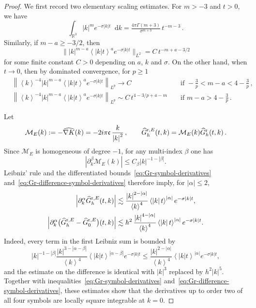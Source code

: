 \documentclass[a4paper,12pt]{amsart} %
\theoremstyle{plain}
\theoremstyle{definition}
\newcommand		{\RR}		{\mathbb R}			%
\newcommand		{\R}		{\RR}
\newcommand		{\Rd}		{\R^3}
\newcommand	{\cM}		{\mathcal M}		%
\newcommand		{\lt}			{\left}				%
\newcommand		{\rt}			{\right}			%
\renewcommand	{\(}			{\lt(}
\renewcommand	{\)}			{\rt)}
\newcommand		{\bangle}[1]	{\lt\langle #1\rt\rangle}
\newcommand		{\weight}[1]	{\bangle{#1}}	%
\newcommand		{\n}[1]			{\lt\lvert{#1}\rt\rvert}	%
\newcommand		{\nrm}[1]		{\lt\lVert{#1}\rt\rVert}		%
\newcommand		{\bnrm}[1]		{\big\lVert #1\big\rVert}
\newcommand		{\Nrm}[2]		{\nrm{#1}_{#2}}
\newcommand		{\bNrm}[2]		{\bnrm{#1}_{#2}}
\renewcommand		{\d}		{\mathop{}\!\mathrm{d}}		%
\newcommand		{\intd}			{\int_{\Rd}}
\newcommand	{\h}			{h}
\newcommand		{\CK}			{\mathfrak{c}}	%
\newcommand		{\hatG}			{\widehat{G}}
\newcommand		{\hatGr}		{\hatG^{\textnormal{r}}}
\newcommand		{\hatGrE}		{\hatG^{\textnormal{r},E}}
\begin{document}
	\begin{proof}
		We first record two elementary scaling estimates. For $m>-3$ and $t>0$, we have
		\begin{equation}\label{eq:radial-L1-scaling}
			\intd \n{k}^m e^{-\sigma \n{k}t} \d k = \tfrac{4\pi \Gamma(m+3)}{\sigma^{m+3}}\, t^{-m-3} \, .
		\end{equation}
		Similarly, if $m-a \geq - 3/2$, then
		\begin{equation}\label{eq:radial-L2-scaling}
			\bNrm{\n{k}^{m-a}\weight{\n{k}t}^{a}e^{-\sigma \n{k} t}}{L^2} = C\, t^{-m+a-3/2}
		\end{equation}
		for some finite constant $C>0$ depending on $a$, $k$ and $\sigma$. On the other hand, when $t\to 0$, then by dominated convergence, for $p\geq 1$
		\begin{align*} %
			&\Nrm{\weight{k}^{-4}\n{k}^{m-a}\weight{\n{k}t}^{a}e^{-\sigma \n{k} t}}{L^p} \to C &&\text{ if } -\frac{3}{p}<m-a<4-\frac{3}{p} \, ,
            \\
            &\Nrm{\weight{k}^{-4}\n{k}^{m-a}\weight{\n{k}t}^{a}e^{-\sigma \n{k} t}}{L^p} \sim C\,t^{4-3/p+a-m} &&\text{ if } m-a>4-\frac{3}{p} \, .
		\end{align*}

		Let
		\begin{equation*}
			\mathcal M_E(k) := -\widehat{\nabla K}(k) = -2i\pi \CK \, \frac{k}{\n{k}^2} \, ,
			\qquad
			\hatGrE_\h(t,k)=\mathcal M_E(k)\hatGr_\h(t,k) \, .
		\end{equation*}
		Since $\mathcal M_E$ is homogeneous of degree $-1$, for any multi-index $\beta$ one has
		\begin{equation*}
			\n{\partial_k^\beta\cM_E(k)} \leq C_\beta \n{k}^{-1-\n{\beta}}  .
		\end{equation*}
		Leibniz' rule and the differentiated bounds~\eqref{eq:Gr-symbol-derivatives} and~\eqref{eq:Gr-difference-symbol-derivatives} therefore imply, for $\n{\alpha}\leq 2$,
		\begin{align}\label{eq:GrE-symbol-derivatives}
			\n{\partial_k^\alpha \hatGrE_\h(t,k)}
			&\lesssim \frac{\n{k}^{2-\n{\alpha}}}{\weight{k}^4}
			\weight{\n{k}t}^{\n{\alpha}}e^{-\sigma \n{k}t},
			\\\label{eq:GrE-difference-symbol-derivatives}
			\n{\partial_k^\alpha
			\bigl(\hatGrE_\h - \hatGrE_0\bigr)(t,k)}
			&\lesssim h^2 \, \frac{\n{k}^{4-\n{\alpha}}}{\weight{k}^4}
			\weight{\n{k}t}^{\n{\alpha}}e^{-\sigma \n{k}t}.
		\end{align}
		Indeed, every term in the first Leibniz sum is bounded by
		\begin{equation*}
			\n{k}^{-1-|\beta|}
			\frac{\n{k}^{3-|\alpha-\beta|}}{\weight{k}^4}
			\weight{\n{k}t}^{|\alpha-\beta|}e^{-\sigma \n{k}t}
			\leq \frac{\n{k}^{2-\n{\alpha}}}{\weight{k}^4}
			\weight{\n{k}t}^{\n{\alpha}}e^{-\sigma \n{k}t},
		\end{equation*}
		and the estimate on the difference is identical with $\n{k}^3$ replaced by $h^2\n{k}^5$. Together with inequalities~\eqref{eq:Gr-symbol-derivatives} and~\eqref{eq:Gr-difference-symbol-derivatives}, these estimates show that the derivatives up to order two of all four symbols are locally square integrable at $k=0$. 


\end{proof}
\end{document}
